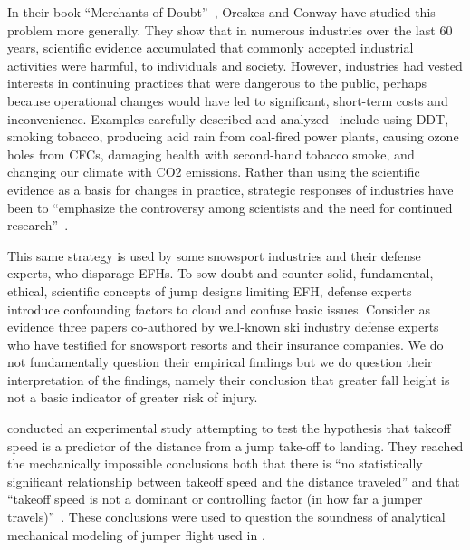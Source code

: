 \documentclass[fleqn,10pt,lineno]{wlpeerj}
\begin{document}
In their book ``Merchants of Doubt''~\citep{Oreskes2010}, Oreskes and Conway
have studied this problem more generally. They show that in numerous industries
over the last 60 years, scientific evidence accumulated that commonly accepted
industrial activities were harmful, to individuals and society. However,
industries had vested interests in continuing practices that were dangerous to
the public, perhaps because operational changes would have led to significant,
short-term costs and inconvenience. Examples carefully described and
analyzed~\cite{Oreskes2010} include using DDT, smoking tobacco, producing acid
rain from coal-fired power plants, causing ozone holes from  CFCs, damaging
health with second-hand tobacco smoke, and changing our climate with CO2
emissions. Rather than using the scientific evidence as a basis for changes in
practice, strategic responses of industries have been to ``emphasize the
controversy among scientists and the need for continued
research''~\cite{Oreskes2010}.

This same strategy is used by some snowsport industries and their defense
experts, who disparage EFHs.  To sow doubt and counter solid, fundamental,
ethical, scientific concepts of jump designs limiting EFH, defense experts
introduce confounding factors to cloud and confuse basic issues. Consider as
evidence three papers \cite{Shealy2010,Shealy2015,Scher2015} co-authored by
well-known ski industry defense experts who have testified for snowsport
resorts and their insurance companies. We do not fundamentally question their
empirical findings but we do question their interpretation of the findings,
namely their conclusion that greater fall height is not a basic indicator of
greater risk of injury.

\cite{Shealy2010} conducted an experimental study attempting to test the
hypothesis that takeoff speed is a predictor of the distance from a jump
take-off to landing. They reached the mechanically impossible conclusions both
that there is ``no statistically significant relationship between takeoff speed
and the distance traveled'' and that ``takeoff speed is not a dominant or
controlling factor (in how far a jumper travels)''~\citep{Shealy2010}. These
conclusions were used to question the soundness of analytical mechanical
modeling of jumper flight used in \cite{Hubbard2009,McNeil2012}.
\end{document}
